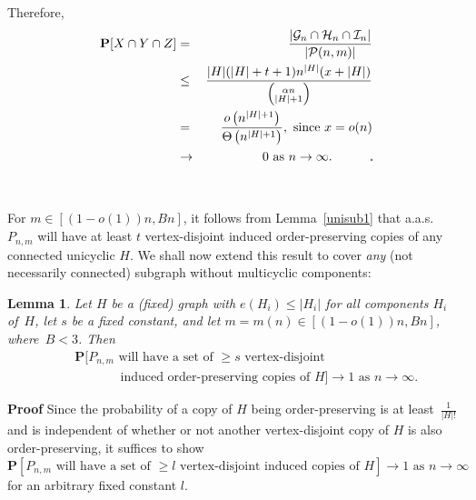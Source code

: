 \documentclass{article}
\newtheorem{Lemma}[Theorem]{Lemma}
\newtheorem{Proof of Theorem}{Proof of Theorem}
\begin{document}
Therefore,
\begin{eqnarray*}
\mathbf{P}[X \cap Y \cap Z]
& = & \frac{|\mathcal{G}_{n} \cap \mathcal{H}_{n} \cap \mathcal{I}_{n}|}{|\mathcal{P}(n,m)|} \\
& \leq & \frac{|H|(|H|+t+1)n^{|H|}(x+|H|)}
{\left( ^{\phantom{w} \alpha n}_{|H|+1} \right) } \\
& = & \frac{o \left( n^{|H|+1} \right) }{\Theta \left( n^{|H|+1} \right) }, \textrm{ since } x=o(n)\\
& \to & 0 \textrm{ as } n \to \infty.
\phantom{qwerty}\begin{picture}(1,1)
\put(0,0){\line(1,0){1}}
\put(0,0){\line(0,1){1}}
\put(1,1){\line(-1,0){1}}
\put(1,1){\line(0,-1){1}}
\end{picture} 
\end{eqnarray*}
\\
\\














For $m \in [(1-o(1))n,Bn]$,
it follows from Lemma~\ref{unisub1} that a.a.s.~$P_{n,m}$ 
will have at least $t$ vertex-disjoint induced order-preserving copies of any connected unicyclic $H$.
We shall now extend this result to cover \textit{any} (not necessarily connected) subgraph without multicyclic components:
\\















\begin{Lemma} \label{unisub21}
Let $H$ be a (fixed) graph with $e(H_{i}) \leq |H_{i}|$ for all components $H_{i}$ of~$\!H$,
let $s$ be a fixed constant,
and let $m=m(n) \in [(1-o(1))n,Bn]$, where~$B<3$.
Then
\begin{eqnarray*}
& & \mathbf{P}\Big[\textrm{$P_{n,m}$ 
will have a set of $\geq s$ vertex-disjoint} \\
& & \phantom{wwwww}\textrm{induced order-preserving copies of $H$}\Big] 
\to 1 
\textrm{ as } n \to \infty.
\end{eqnarray*} 
\end{Lemma}
\textbf{Proof}
Since the probability of a copy of $H$ being order-preserving is at least~$\frac{1}{|H|!}$
and is independent of whether or not another vertex-disjoint copy of $H$ is also order-preserving,
it suffices to show 
\begin{displaymath}
\mathbf{P}[P_{n,m} 
\textrm{ will have a set of $\geq l$ vertex-disjoint induced copies of }H] \!\to\! 1 
\textrm{ as } n \!\to\! \infty
\end{displaymath}
for an arbitrary fixed constant $l$.
\end{document}

